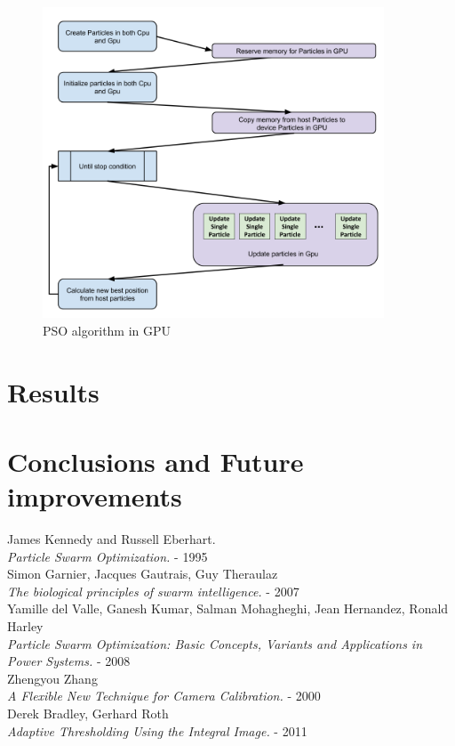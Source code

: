 \documentclass[journal]{IEEEtran}
\begin{document}
\begin{figure}
\centering
\includegraphics[width=4.0in]{_img/img_PSO_algorithm_gpu.png}
\caption{PSO algorithm in GPU}
\end{figure}

\section{Results}


\section{Conclusions and Future improvements}



\begin{thebibliography}{1}

  James Kennedy and Russell Eberhart. \\
  \textit{Particle Swarm Optimization.} - 1995
\\
  Simon Garnier, Jacques Gautrais, Guy Theraulaz\\
  \textit{The biological principles of swarm intelligence.} - 2007
\\
  Yamille del Valle, Ganesh Kumar, Salman Mohagheghi, Jean Hernandez, Ronald Harley\\
  \textit{Particle Swarm Optimization: Basic Concepts, Variants and Applications in Power Systems.} - 2008
\\
  Zhengyou Zhang \\
  \textit{A Flexible New Technique for Camera Calibration.} - 2000
\\
  Derek Bradley, Gerhard Roth \\
  \textit{Adaptive Thresholding Using the Integral Image.} - 2011

\end{thebibliography}
\end{document}
